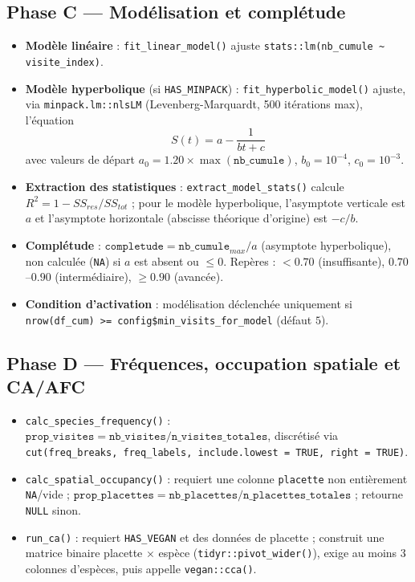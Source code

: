 \documentclass[11pt,a4paper]{article}
\begin{document}
\subsection{Phase C --- Modélisation et complétude}
\begin{itemize}[leftmargin=1.2cm]
  \item \textbf{Modèle linéaire} : \texttt{fit\_linear\_model()} ajuste \texttt{stats::lm(nb\_cumule \textasciitilde{} visite\_index)}.
  \item \textbf{Modèle hyperbolique} (si \texttt{HAS\_MINPACK}) : \texttt{fit\_hyperbolic\_model()} ajuste, via \texttt{minpack.lm::nlsLM} (Levenberg-Marquardt, 500 itérations max), l'équation
  $$ S(t) = a - \frac{1}{bt + c} $$
  avec valeurs de départ $a_0 = 1.20 \times \max(\texttt{nb\_cumule})$, $b_0 = 10^{-4}$, $c_0 = 10^{-3}$.
  \item \textbf{Extraction des statistiques} : \texttt{extract\_model\_stats()} calcule $R^2 = 1 - SS_{res}/SS_{tot}$ ; pour le modèle hyperbolique, l'asymptote verticale est $a$ et l'asymptote horizontale (abscisse théorique d'origine) est $-c/b$.
  \item \textbf{Complétude} : $\texttt{completude} = \texttt{nb\_cumule}_{max} / a$ (asymptote hyperbolique), non calculée (\texttt{NA}) si $a$ est absent ou $\le 0$. Repères : $< 0.70$ (insuffisante), $0.70$--$0.90$ (intermédiaire), $\ge 0.90$ (avancée).
  \item \textbf{Condition d'activation} : modélisation déclenchée uniquement si \texttt{nrow(df\_cum) >= config\$min\_visits\_for\_model} (défaut $5$).
\end{itemize}

\subsection{Phase D --- Fréquences, occupation spatiale et CA/AFC}
\begin{itemize}[leftmargin=1.2cm]
  \item \texttt{calc\_species\_frequency()} : $\texttt{prop\_visites} = \texttt{nb\_visites} / \texttt{n\_visites\_totales}$, discrétisé via \texttt{cut(freq\_breaks, freq\_labels, include.lowest = TRUE, right = TRUE)}.
  \item \texttt{calc\_spatial\_occupancy()} : requiert une colonne \texttt{placette} non entièrement \texttt{NA}/vide ; $\texttt{prop\_placettes} = \texttt{nb\_placettes} / \texttt{n\_placettes\_totales}$ ; retourne \texttt{NULL} sinon.
  \item \texttt{run\_ca()} : requiert \texttt{HAS\_VEGAN} et des données de placette ; construit une matrice binaire placette $\times$ espèce (\texttt{tidyr::pivot\_wider()}), exige au moins 3 colonnes d'espèces, puis appelle \texttt{vegan::cca()}.
\end{itemize}
\end{document}
